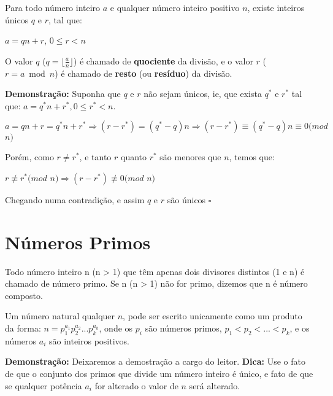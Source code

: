 \begin{theorem}\label{algoritmo_divisao}
Para todo número inteiro $a$ e qualquer número inteiro positivo $n$, existe inteiros únicos $q$ e $r$, tal que:

$a = qn + r$, $0 \leq r < n$

O valor $q$ ($q = \lfloor  \frac{a}{n} \rfloor$) é chamado de \textbf{quociente} da divisão, e o valor $r$ ($r = a \bmod n$) é chamado de \textbf{resto}
(ou \textbf{resíduo}) da divisão.
\end{theorem}
\textbf{Demonstração:}
Suponha que $q$ e $r$ não sejam únicos, ie, que exista $q^*$ e $r^*$ tal que: $a = q^*n + r^*, 0 \leq r^* < n$.

$a = qn + r = q^*n + r^* \Rightarrow (r - r^*) = (q^* - q)n \Rightarrow (r - r^*) \equiv (q^* - q)n \equiv 0 (mod$ $n)$

Porém, como $r \neq r^*$, e tanto $r$ quanto $r^*$ são menores que $n$, temos que: 

$r \not\equiv r^* (mod$ $n) \Rightarrow (r - r^*) \not\equiv 0 (mod$ $n)$

Chegando numa contradição, e assim $q$ e $r$ são únicos $\square$ \\

\section{Números Primos}

\begin{definition} 
Todo número inteiro n (n > 1) que têm apenas dois divisores distintos (1 e n) é chamado de número primo. Se n (n > 1) não for primo, dizemos que n é número composto.
\end{definition}

\begin{theorem}\label{fatoracao_unica}
Um número natural qualquer $n$, pode ser escrito unicamente como um produto da forma: 
$n = p_1^{a_1}p_2^{a_2}...p_k^{a_k}$, onde os $p_i$ são números primos, $p_1 < p_2 < ... < p_k$, e os números $a_i$ são inteiros positivos.
\end{theorem}
\textbf{Demonstração:}
Deixaremos a demostração a cargo do leitor.
\textbf{Dica:} Use o fato de que o conjunto dos primos que divide um número inteiro é único, e fato de que se qualquer potência $a_i$ for alterado o valor de $n$ será alterado.


